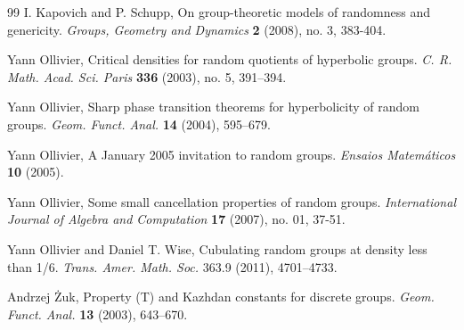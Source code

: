 \documentclass{article}
\theoremstyle{remark}
\begin{document}
\begin{thebibliography}{99}
 I. Kapovich and P. Schupp,
    On group-theoretic models of randomness and genericity.
    \textit{Groups, Geometry and Dynamics} \textbf{2} (2008), no. 3, 383-404.
    
 Yann Ollivier,
    Critical densities for random quotients of hyperbolic groups. 
    \textit{C. R. Math. Acad. Sci. Paris} \textbf{336} (2003), no. 5, 391–394.

 Yann Ollivier,
    Sharp phase transition theorems for hyperbolicity of random groups.
    \textit{Geom. Funct. Anal.} \textbf{14} (2004), 595–679.

 Yann Ollivier, 
    A January 2005 invitation to random groups. \textit{Ensaios Matemáticos} \textbf{10} (2005).

 Yann Ollivier,
    Some small cancellation properties of random groups. \textit{International Journal of Algebra and Computation} \textbf{17} (2007), no. 01, 37-51.

 Yann Ollivier and Daniel T. Wise, 
    Cubulating random groups at density less than 1/6. \textit{Trans. Amer. Math. Soc.} 363.9 (2011), 4701–4733. 

 Andrzej \.Zuk,
    Property (T) and Kazhdan constants for discrete groups. \textit{Geom. Funct. Anal.} \textbf{13} (2003), 643–670.

\end{thebibliography}

%
\end{document}
